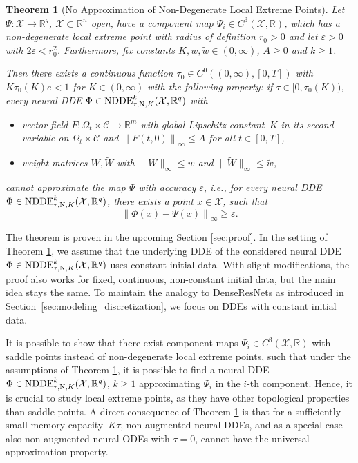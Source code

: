 \documentclass[10pt]{article}
\numberwithin{equation}{section}
\newtheorem{theorem}{Theorem}[section]
\newcommand{\eps}{\varepsilon}
\newcommand\norm[1]{\left\lVert#1\right\rVert}
\newcommand\normm[1]{\big\lVert#1\big\lVert}
\newcommand{\R}{\mathbb{R}}
\begin{document}
	
	\begin{theorem}[No Approximation of Non-Degenerate Local Extreme Points] \label{th:noapproximation}
		Let $\Psi:\mathcal{X}\rightarrow \mathbb{R}^q$,  $\mathcal{X}\subset \mathbb{R}^n$ open, have a component map $\Psi_i\in C^3(\mathcal{X}, \mathbb{R})$, which has a non-degenerate local extreme point with radius of definition $r_0>0$ and let $\eps>0$ with $2\eps<r_0^2$. Furthermore, fix constants $K, w,\tilde{w} \in (0,\infty)$, $A\geq 0$ and $k\geq 1$.
		
		Then there exists a continuous function $\tau_0\in C^0((0,\infty),[0,T])$ with $K \tau_0(K) e<1$ for $K\in(0,\infty)$ with the following property: if $\tau \in [0,\tau_0(K))$, every neural DDE $\Phi \in \textup{NDDE}_{\tau,\textup{N},K}^k(\mathcal{X},\mathbb{R}^q)$ with
		\begin{itemize}
			\item  vector field $F:\Omega_t \times \mathcal{C} \rightarrow \mathbb{R}^m$ with global Lipschitz constant~$K$ in its second variable on $\Omega_t \times \mathcal{C}$ and $\norm{F(t,0)}_\infty \leq A$ for all $t\in [0,T]$,
			\item weight matrices $W, \widetilde{W}$ with $\normm{W}_\infty \leq w$ and $\normm{\widetilde{W}}_\infty \leq\tilde{w}$,
		\end{itemize}
		cannot approximate the map $\Psi$ with accuracy $\eps$, i.e., for every neural DDE $\Phi \in \textup{NDDE}_{\tau,\textup{N},K}^k(\mathcal{X},\mathbb{R}^q)$, there exists a point $x \in \mathcal{X}$, such that 
		\begin{equation*}
			\norm{\Phi(x)-\Psi(x)}_\infty \geq \eps.
		\end{equation*}
	\end{theorem}
	
	The theorem is proven in the upcoming Section \ref{sec:proof}. In the setting of Theorem \ref{th:noapproximation}, we assume that the underlying DDE of the considered neural DDE $\Phi \in \textup{NDDE}_{\tau,\textup{N},K}^k(\mathcal{X},\mathbb{R}^q)$ uses constant initial data. With slight modifications, the proof also works for fixed, continuous, non-constant initial data, but the main idea stays the same. To maintain the analogy to DenseResNets as introduced in Section~\ref{sec:modeling_discretization}, we focus on DDEs with constant initial data.
	
	It is possible to show that there exist component maps $\Psi_i\in C^3(\mathcal{X},\R)$ with saddle points instead of non-degenerate local extreme points, such that under the assumptions of Theorem \ref{th:noapproximation}, it is possible to find a neural DDE $\Phi \in \textup{NDDE}_{\tau,\textup{N},K}^k(\mathcal{X},\mathbb{R}^q)$, $k \geq 1$ approximating $\Psi_i$ in the $i$-th component. Hence, it is crucial to study local extreme points, as they have other topological properties than saddle points. A direct consequence of Theorem \ref{th:noapproximation} is that for a sufficiently small memory capacity~$K\tau$, non-augmented neural DDEs, and as a special case also non-augmented neural ODEs with $\tau = 0$, cannot have the universal approximation property.
	
\end{document}
